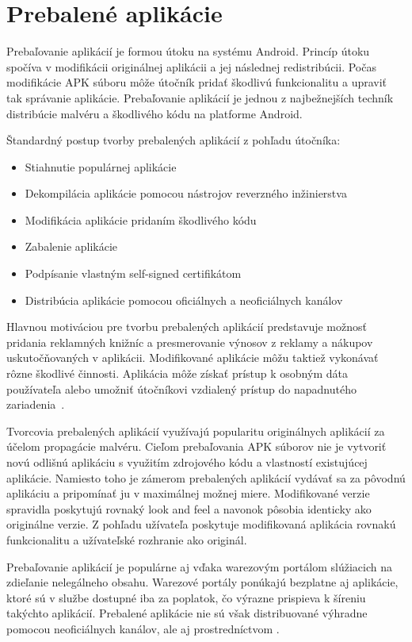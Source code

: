 \chapter{Prebalené aplikácie}
Prebaľovanie aplikácií je formou útoku na systému Android. Princíp útoku spočíva v modifikácii originálnej aplikácii a jej následnej redistribúcii. Počas modifikácie APK súboru môže útočník pridať škodlivú funkcionalitu a upraviť tak správanie aplikácie.
Prebaľovanie aplikácií je jednou z najbežnejších techník distribúcie malvéru a škodlivého kódu na platforme Android. 

Štandardný postup tvorby prebalených aplikácií z pohľadu útočníka:
\begin{itemize}
	\item Stiahnutie populárnej aplikácie
	\item Dekompilácia aplikácie pomocou nástrojov reverzného inžinierstva
	\item Modifikácia aplikácie pridaním škodlivého kódu
	\item Zabalenie aplikácie
	\item Podpísanie vlastným self-signed certifikátom
	\item Distribúcia aplikácie pomocou oficiálnych a neoficiálnych kanálov 
\end{itemize}

Hlavnou motiváciou pre tvorbu prebalených aplikácií predstavuje možnosť pridania reklamných knižníc a presmerovanie výnosov z reklamy a nákupov uskutočňovaných v aplikácii. Modifikované aplikácie môžu  taktiež vykonávať rôzne škodlivé činnosti. Aplikácia môže získať prístup k osobným dáta používateľa alebo umožniť útočníkovi vzdialený prístup do napadnutého zariadenia~\cite{DetectingRepackagedZhou, Zhou2012}.

Tvorcovia prebalených aplikácií využívajú popularitu originálnych aplikácií za účelom propagácie malvéru. Cieľom prebaľovania APK súborov nie je vytvoriť novú odlišnú aplikáciu s využitím zdrojového kódu a vlastností existujúcej aplikácie. Namiesto toho je zámerom prebalených aplikácií vydávať sa za pôvodnú aplikáciu a pripomínať ju v maximálnej možnej miere. Modifikované verzie spravidla poskytujú rovnaký look and feel a navonok pôsobia identicky ako originálne verzie. Z pohľadu užívateľa poskytuje modifikovaná aplikácia rovnakú funkcionalitu a užívateľské rozhranie ako originál. 

Prebaľovanie aplikácií je populárne aj vďaka warezovým portálom slúžiacich na zdieľanie nelegálneho obsahu. Warezové portály ponúkajú bezplatne aj aplikácie, ktoré sú v službe  dostupné iba za poplatok, čo výrazne prispieva k šíreniu takýchto aplikácií. Prebalené aplikácie nie sú však distribuované výhradne pomocou neoficiálnych kanálov, ale aj prostredníctvom .

